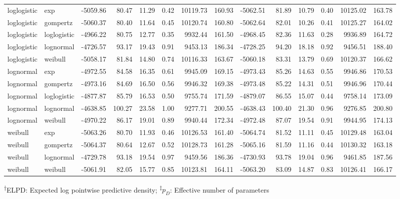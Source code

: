 \documentclass[AMA,STIX1COL]{WileyNJD-v2}
\begin{document}
\begin{center}
\begin{table}[t]
\begin{tabular}{llrrrrrrrrrrrr}
loglogistic & exp & -5059.86 & 80.47 & 11.29 & 0.42 & 10119.73 & 160.93 & -5062.51 & 81.89 & 10.79 & 0.40 & 10125.02 & 163.78\\
loglogistic & gompertz & -5060.37 & 80.40 & 11.64 & 0.45 & 10120.74 & 160.80 & -5062.64 & 82.01 & 10.26 & 0.41 & 10125.27 & 164.02\\
loglogistic & loglogistic & -4966.22 & 80.75 & 12.77 & 0.35 & 9932.44 & 161.50 & -4968.45 & 82.36 & 11.63 & 0.28 & 9936.89 & 164.72\\
loglogistic & lognormal & -4726.57 & 93.17 & 19.43 & 0.91 & 9453.13 & 186.34 & -4728.25 & 94.20 & 18.18 & 0.92 & 9456.51 & 188.40\\
loglogistic & weibull & -5058.17 & 81.84 & 14.80 & 0.74 & 10116.33 & 163.67 & -5060.18 & 83.31 & 13.79 & 0.69 & 10120.37 & 166.62\\
lognormal & exp & -4972.55 & 84.58 & 16.35 & 0.61 & 9945.09 & 169.15 & -4973.43 & 85.26 & 14.63 & 0.55 & 9946.86 & 170.53\\
lognormal & gompertz & -4973.16 & 84.69 & 16.50 & 0.56 & 9946.32 & 169.38 & -4973.48 & 85.22 & 14.31 & 0.51 & 9946.96 & 170.44\\
lognormal & loglogistic & -4877.87 & 85.79 & 16.53 & 0.50 & 9755.74 & 171.59 & -4879.07 & 86.55 & 15.07 & 0.44 & 9758.14 & 173.09\\
lognormal & lognormal & -4638.85 & 100.27 & 23.58 & 1.00 & 9277.71 & 200.55 & -4638.43 & 100.40 & 21.30 & 0.96 & 9276.85 & 200.80\\
lognormal & weibull & -4970.22 & 86.17 & 19.01 & 0.89 & 9940.44 & 172.34 & -4972.48 & 87.07 & 19.54 & 0.91 & 9944.95 & 174.13\\
weibull & exp & -5063.26 & 80.70 & 11.93 & 0.46 & 10126.53 & 161.40 & -5064.74 & 81.52 & 11.11 & 0.45 & 10129.48 & 163.04\\
weibull & gompertz & -5064.37 & 80.64 & 12.67 & 0.52 & 10128.73 & 161.28 & -5065.16 & 81.59 & 11.16 & 0.44 & 10130.32 & 163.18\\
weibull & lognormal & -4729.78 & 93.18 & 19.54 & 0.97 & 9459.56 & 186.36 & -4730.93 & 93.78 & 19.04 & 0.96 & 9461.85 & 187.56\\
weibull & weibull & -5061.91 & 82.05 & 15.77 & 0.85 & 10123.81 & 164.11 & -5063.20 & 83.09 & 14.87 & 0.83 & 10126.41 & 166.17\\
\bottomrule
\end{tabular}
\begin{tablenotes}%
\textsuperscript{$\dagger$}ELPD: Expected log pointwise predictive density;
\textsuperscript{$\ddagger$}$p_D$: Effective number of parameters
\end{tablenotes}
\end{table}
\end{center}
\end{document}
